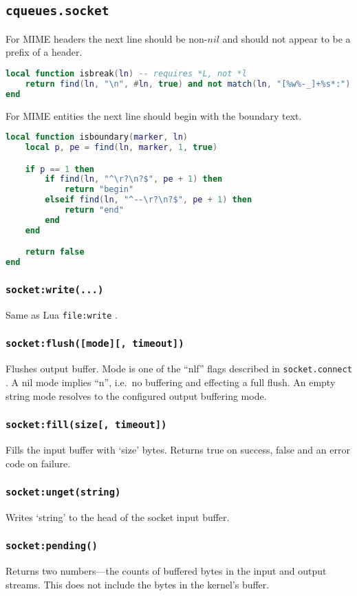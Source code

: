 \documentclass[11pt, oneside]{memoir}
\newcommand{\fn}[1]{\texttt{#1} }
\newcommand{\method}[1]{\texttt{#1} }
\newcounter{toccols}
\newenvironment{Module}[1]{
	\subsection{\texttt{#1}}
	\addtocontents{toc}{
		\protect\begin{multicols}{\value{toccols}}
	}
}{
	\addtocontents{toc}{\protect\end{multicols}}
}
\begin{document}
\begin{Module}{cqueues.socket}
For MIME headers the next line should be non-$nil$ and should not appear to be a prefix of a header.

\begin{lstlisting}[language=lua]
local function isbreak(ln) -- requires *L, not *l
	return find(ln, "\n", #ln, true) and not match(ln, "[%w%-_]+%s*:")
end
\end{lstlisting}

For MIME entities the next line should begin with the boundary text.

\begin{lstlisting}[language=lua]
local function isboundary(marker, ln)
	local p, pe = find(ln, marker, 1, true)

	if p == 1 then
		if find(ln, "^\r?\n?$", pe + 1) then
			return "begin"
		elseif find(ln, "^--\r?\n?$", pe + 1) then
			return "end"
		end
	end

	return false
end
\end{lstlisting}


\subsubsection[\fn{socket:write}]{\fn{socket:write(...)}}
Same as Lua \fn{file:write}.

\subsubsection[\fn{socket:flush}]{\fn{socket:flush([mode][, timeout])}}
Flushes output buffer. Mode is one of the ``nlf'' flags described in \method{socket.connect}. A nil mode implies ``n'', i.e.\ no buffering and effecting a full flush. An empty string mode resolves to the configured output buffering mode.

\subsubsection[\fn{socket:fill}]{\fn{socket:fill(size[, timeout])}}
Fills the input buffer with `size' bytes. Returns true on success, false and an error code on failure.

\subsubsection[{\fn{socket:unget}}]{\fn{socket:unget(string)}}
Writes `string' to the head of the socket input buffer.

\subsubsection[{\fn{socket:pending}}]{\fn{socket:pending()}}
Returns two numbers---the counts of buffered bytes in the input and output streams. This does not include the bytes in the kernel's buffer.


\end{Module}
\end{document}
